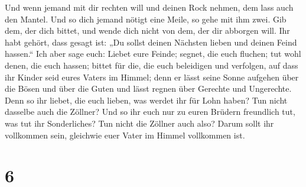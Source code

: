  Und wenn jemand mit dir rechten will und deinen Rock
nehmen, dem lass auch den Mantel.  Und so dich jemand
nötigt eine Meile, so gehe mit ihm zwei.  Gib dem, der
dich bittet, und wende dich nicht von dem, der dir abborgen will.
 Ihr habt gehört, dass gesagt ist: „Du sollst deinen
Nächsten lieben und deinen Feind hassen.``  Ich aber sage
euch: Liebet eure Feinde; segnet, die euch fluchen; tut wohl denen, die
euch hassen; bittet für die, die euch beleidigen und verfolgen,
 auf dass ihr Kinder seid eures Vaters im Himmel; denn er
lässt seine Sonne aufgehen über die Bösen und über die Guten und lässt
regnen über Gerechte und Ungerechte.  Denn so ihr liebet,
die euch lieben, was werdet ihr für Lohn haben? Tun nicht dasselbe auch
die Zöllner?  Und so ihr euch nur zu euren Brüdern
freundlich tut, was tut ihr Sonderliches? Tun nicht die Zöllner auch
also?  Darum sollt ihr vollkommen sein, gleichwie euer
Vater im Himmel vollkommen ist.

\hypertarget{section-5}{%
\section{6}\label{section-5}}

